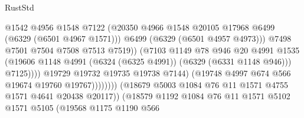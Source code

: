 \begin{lexlean}{RustStd}
\begin{coremodule}
{{                                                  @1542
                                                  @4956
                                                  @1548
                                                  @7122
                                                  (@20350
                                                    @4966
                                                    @1548
                                                    @20105
                                                    @17968
                                                    @6499
                                                    (@6329 (@6501 @4967 @1571)))
                                                  @6499
                                                  (@6329 (@6501 @4957 @4973)))
                                                @7498
                                                @7501
                                                @7504
                                                @7508
                                                @7513
                                                @7519))
                                            (@7103
                                              @1149
                                              @78
                                              @946
                                              @20
                                              @4991
                                              @1535
                                              (@19606
                                                @1148
                                                @4991
                                                (@6324 (@6325 @4991))
                                                (@6329 (@6331 @1148 @946)))
                                              @7125))))
                                      @19729
                                      @19732
                                      @19735
                                      @19738
                                      @7144)
                                    (@19748 @4997 @674 @566 @19674 @19760 @19767))))))))
                      (@18679 @5003 @1084 @76 @11 @1571 @4755 @1571 @4641 @20438 @20117))
                    (@18579
                      @1192
                      @1084
                      @76
                      @11
                      @1571
                      @5102
                      @1571
                      @5105
                      (@19568
                        @1175
                        @1190
                        @566
}}
\end{coremodule}
\end{lexlean}
